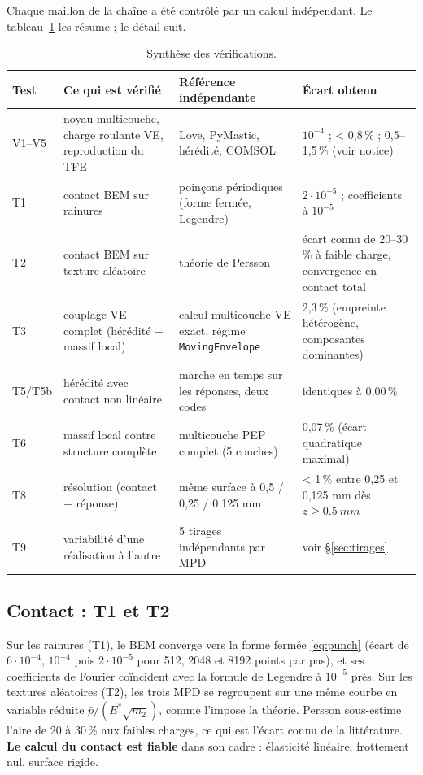 Chaque maillon de la chaîne a été contrôlé par un calcul indépendant. Le
tableau~\ref{tab:verifs} les résume ; le détail suit.

\begin{table}[H]\centering\small
\caption{Synthèse des vérifications.}\label{tab:verifs}
\begin{tabular}{p{0.8cm}p{4.6cm}p{5.2cm}p{3.6cm}}
\toprule
Test & Ce qui est vérifié & Référence indépendante & Écart obtenu\\
\midrule
V1--V5 & noyau multicouche, charge roulante VE, reproduction du TFE & Love, PyMastic, hérédité, COMSOL & $10^{-4}$ ; < 0,8\,\% ; 0,5--1,5\,\% (voir notice)\\
T1 & contact BEM sur rainures & poinçons périodiques (forme fermée, Legendre) & $2\cdot10^{-5}$ ; coefficients à $10^{-5}$\\
T2 & contact BEM sur texture aléatoire & théorie de Persson & écart connu de 20--30\,\% à faible charge, convergence en contact total\\
T3 & couplage VE complet (hérédité + massif local) & calcul multicouche VE exact, régime \texttt{MovingEnvelope} & 2,3\,\% (empreinte hétérogène, composantes dominantes)\\
T5/T5b & hérédité avec contact non linéaire & marche en temps sur les réponses, deux codes & identiques à 0,00\,\%\\
T6 & massif local contre structure complète & multicouche PEP complet (5 couches) & 0,07\,\% (écart quadratique maximal)\\
T8 & résolution (contact + réponse) & même surface à 0,5 / 0,25 / 0,125 mm & < 1\,\% entre 0,25 et 0,125 mm dès $z\ge\SI{0.5}{mm}$\\
T9 & variabilité d'une réalisation à l'autre & 5 tirages indépendants par MPD & voir \S\ref{sec:tirages}\\
\bottomrule
\end{tabular}
\end{table}

\subsection{Contact : T1 et T2}
Sur les rainures (T1), le BEM converge vers la forme fermée \eqref{eq:punch} (écart de
$6\cdot10^{-4}$, $10^{-4}$ puis $2\cdot10^{-5}$ pour 512, 2048 et 8192 points par pas), et ses
coefficients de Fourier coïncident avec la formule de Legendre à $10^{-5}$ près. Sur les textures
aléatoires (T2), les trois MPD se regroupent sur une même courbe en variable réduite
$\bar p/(E^*\sqrt{m_2})$, comme l'impose la théorie. Persson sous-estime l'aire de 20 à 30\,\% aux
faibles charges, ce qui est l'écart connu de la littérature. \textbf{Le calcul du contact est
fiable} dans son cadre : élasticité linéaire, frottement nul, surface rigide.


